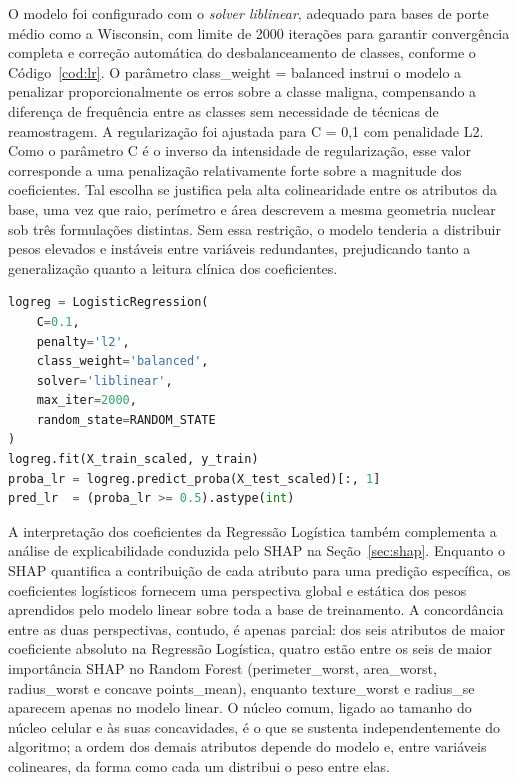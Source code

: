 \documentclass[
    12pt
    ,oneside
    ,a4paper
    ,chapter=TITLE
    ,section=TITLE
    ,sumario=abnt-6027-2012
    ,english,brazil]{abntex2} %
\begin{document}
O modelo foi configurado com o \textit{solver liblinear}, adequado para bases de
porte médio como a Wisconsin, com limite de 2000 iterações para garantir
convergência completa e correção automática do desbalanceamento de classes,
conforme o Código~\ref{cod:lr}. O parâmetro class\_weight = balanced instrui o
modelo a penalizar proporcionalmente os erros sobre a classe maligna,
compensando a diferença de frequência entre as classes sem necessidade de
técnicas de reamostragem. A regularização foi ajustada para C = 0,1 com
penalidade L2. Como o parâmetro C é o inverso da intensidade de regularização,
esse valor corresponde a uma penalização relativamente forte sobre a magnitude
dos coeficientes. Tal escolha se justifica pela alta colinearidade entre os
atributos da base, uma vez que raio, perímetro e área descrevem a mesma
geometria nuclear sob três formulações distintas. Sem essa restrição, o modelo tenderia a
distribuir pesos elevados e instáveis entre variáveis redundantes, prejudicando
tanto a generalização quanto a leitura clínica dos coeficientes.

\begin{codigo}[htb]
\begin{lstlisting}[language=Python]
logreg = LogisticRegression(
    C=0.1,
    penalty='l2',
    class_weight='balanced',
    solver='liblinear',
    max_iter=2000,
    random_state=RANDOM_STATE
)
logreg.fit(X_train_scaled, y_train)
proba_lr = logreg.predict_proba(X_test_scaled)[:, 1]
pred_lr  = (proba_lr >= 0.5).astype(int)
\end{lstlisting}
\fonteautor
\end{codigo}

A interpretação dos coeficientes da Regressão Logística também complementa
a análise de explicabilidade conduzida pelo SHAP na Seção~\ref{sec:shap}.
Enquanto o SHAP quantifica a contribuição de cada atributo para uma predição
específica, os coeficientes logísticos fornecem uma perspectiva global e
estática dos pesos aprendidos pelo modelo linear sobre toda a base de
treinamento. A concordância entre as duas perspectivas, contudo, é apenas
parcial: dos seis atributos de maior coeficiente absoluto na Regressão
Logística, quatro estão entre os seis de maior importância SHAP no Random
Forest (perimeter\_worst, area\_worst, radius\_worst e concave points\_mean),
enquanto texture\_worst e radius\_se aparecem apenas no modelo linear. O núcleo
comum, ligado ao tamanho do núcleo celular e às suas concavidades, é o que se
sustenta independentemente do algoritmo; a ordem dos demais atributos depende
do modelo e, entre variáveis colineares, da forma como cada um distribui o peso
entre elas.
\end{document}
